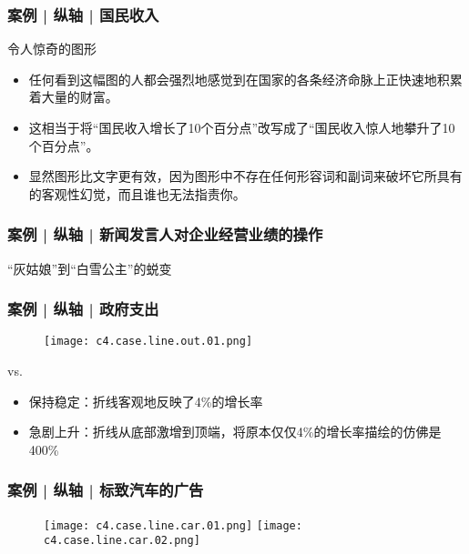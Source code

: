 \begin{frame}
  \frametitle{案例 | 纵轴 | 国民收入}
  \begin{block}{令人惊奇的图形}
    \begin{itemize}
      \item 任何看到这幅图的人都会强烈地感觉到在国家的各条经济命脉上正快速地积累着大量的财富。
      \item 这相当于将“国民收入增长了10个百分点”改写成了“国民收入惊人地攀升了10个百分点”。
      \item 显然图形比文字更有效，因为图形中不存在任何形容词和副词来破坏它所具有的客观性幻觉，而且谁也无法指责你。
    \end{itemize}
  \end{block}
\end{frame}

\begin{frame}
  \frametitle{案例 | 纵轴 | 新闻发言人对企业经营业绩的操作}
  \begin{block}{“灰姑娘”到“白雪公主”的蜕变}
    \begin{figure}
      \centering
    \end{figure}
  \end{block}
\end{frame}

\begin{frame}
  \frametitle{案例 | 纵轴 | 政府支出}
  \begin{figure}
    \centering
    \texttt{[image: c4.case.line.out.01.png]}
  \end{figure}
  \vspace{-1em}
  \begin{block}{vs.}
    \begin{itemize}
      \item 保持稳定：折线客观地反映了4\%的增长率
      \item 急剧上升：折线从底部激增到顶端，将原本仅仅4\%的增长率描绘的仿佛是400\%
    \end{itemize}
  \end{block}
\end{frame}

\begin{frame}
  \frametitle{案例 | 纵轴 | 标致汽车的广告}
  \begin{figure}
    \centering
    \texttt{[image: c4.case.line.car.01.png]}\quad
    \texttt{[image: c4.case.line.car.02.png]}
  \end{figure}
\end{frame}

